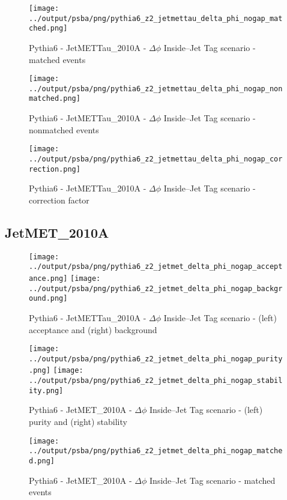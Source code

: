 \documentclass[11pt]{book}
\begin{document}
\begin{figure}[ht]
\centering
\texttt{[image: ../output/psba/png/pythia6\_z2\_jetmettau\_delta\_phi\_nogap\_matched.png]}
\caption{Pythia6 - JetMETTau\_2010A - $\Delta\phi$ Inside--Jet Tag scenario - matched events}
\label{fig:p6_jetmettau_delta_phi_nogap_matched}
\end{figure}

\begin{figure}[ht]
\centering
\texttt{[image: ../output/psba/png/pythia6\_z2\_jetmettau\_delta\_phi\_nogap\_nonmatched.png]}
\caption{Pythia6 - JetMETTau\_2010A - $\Delta\phi$ Inside--Jet Tag scenario - nonmatched events}
\label{fig:p6_jetmettau_delta_phi_nogap_nonmatched}
\end{figure}

\begin{figure}[ht]
\centering
\texttt{[image: ../output/psba/png/pythia6\_z2\_jetmettau\_delta\_phi\_nogap\_correction.png]}
\caption{Pythia6 - JetMETTau\_2010A - $\Delta\phi$ Inside--Jet Tag scenario - correction factor}
\label{fig:p6_jetmettau_delta_phi_nogap_correction}
\end{figure}


\clearpage
\subsection{JetMET\_2010A}

\begin{figure}[ht]
\centering
\texttt{[image: ../output/psba/png/pythia6\_z2\_jetmet\_delta\_phi\_nogap\_acceptance.png]}
\texttt{[image: ../output/psba/png/pythia6\_z2\_jetmet\_delta\_phi\_nogap\_background.png]}
\caption{Pythia6 - JetMETTau\_2010A - $\Delta\phi$ Inside--Jet Tag scenario - (left) acceptance and (right) background}
\label{fig:p6_jetmettau_delta_phi_nogap_ab}
\end{figure}

\begin{figure}[ht]
\centering
\texttt{[image: ../output/psba/png/pythia6\_z2\_jetmet\_delta\_phi\_nogap\_purity.png]}
\texttt{[image: ../output/psba/png/pythia6\_z2\_jetmet\_delta\_phi\_nogap\_stability.png]}
\caption{Pythia6 - JetMET\_2010A - $\Delta\phi$ Inside--Jet Tag scenario - (left) purity and (right) stability}
\label{fig:p6_jetmet_delta_phi_nogap_ps}
\end{figure}

\begin{figure}[ht]
\centering
\texttt{[image: ../output/psba/png/pythia6\_z2\_jetmet\_delta\_phi\_nogap\_matched.png]}
\caption{Pythia6 - JetMET\_2010A - $\Delta\phi$ Inside--Jet Tag scenario - matched events}
\label{fig:p6_jetmet_delta_phi_nogap_matched}
\end{figure}
\end{document}
